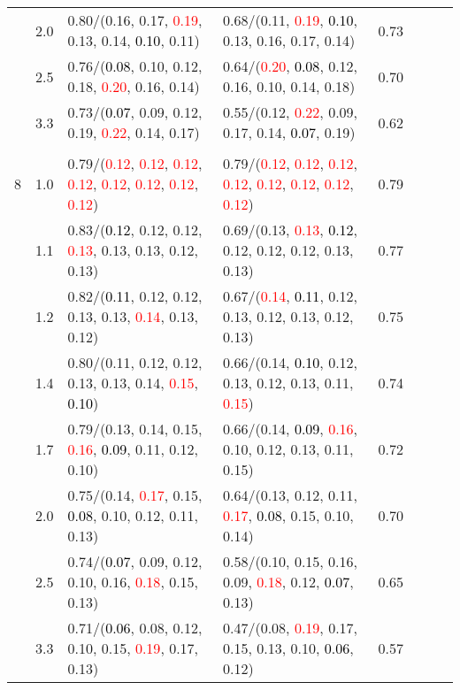 \documentclass[10pt,a4paper]{report}
\begin{document}
\begin{table}[!htbp]
\begin{center}
{\begin{tabular}{ccllcccc}
			&2.0&0.80/(0.16, 0.17, \textcolor{red}{0.19}, 0.13, 0.14, \textcolor{black}{0.10}, 0.11)&0.68/(0.11, \textcolor{red}{0.19}, \textcolor{black}{0.10}, 0.13, 0.16, 0.17, 0.14)&0.73\\
			&2.5&0.76/(\textcolor{black}{0.08}, 0.10, 0.12, 0.18, \textcolor{red}{0.20}, 0.16, 0.14)&0.64/(\textcolor{red}{0.20}, \textcolor{black}{0.08}, 0.12, 0.16, 0.10, 0.14, 0.18)&0.70\\
			&3.3&0.73/(\textcolor{black}{0.07}, 0.09, 0.12, 0.19, \textcolor{red}{0.22}, 0.14, 0.17)&0.55/(0.12, \textcolor{red}{0.22}, 0.09, 0.17, 0.14, \textcolor{black}{0.07}, 0.19)&0.62\\
			&&&&\\
			8			&1.0&0.79/(\textcolor{red}{0.12}, \textcolor{red}{0.12}, \textcolor{red}{0.12}, \textcolor{red}{0.12}, \textcolor{red}{0.12}, \textcolor{red}{0.12}, \textcolor{red}{0.12}, \textcolor{red}{0.12})&0.79/(\textcolor{red}{0.12}, \textcolor{red}{0.12}, \textcolor{red}{0.12}, \textcolor{red}{0.12}, \textcolor{red}{0.12}, \textcolor{red}{0.12}, \textcolor{red}{0.12}, \textcolor{red}{0.12})&0.79\\
			&1.1&0.83/(\textcolor{black}{0.12}, 0.12, 0.12, \textcolor{red}{0.13}, 0.13, 0.13, 0.12, 0.13)&0.69/(0.13, \textcolor{red}{0.13}, \textcolor{black}{0.12}, 0.12, 0.12, 0.12, 0.13, 0.13)&0.77\\
			&1.2&0.82/(\textcolor{black}{0.11}, 0.12, 0.12, 0.13, 0.13, \textcolor{red}{0.14}, 0.13, 0.12)&0.67/(\textcolor{red}{0.14}, \textcolor{black}{0.11}, 0.12, 0.13, 0.12, 0.13, 0.12, 0.13)&0.75\\
			&1.4&0.80/(0.11, 0.12, 0.12, 0.13, 0.13, 0.14, \textcolor{red}{0.15}, \textcolor{black}{0.10})&0.66/(0.14, \textcolor{black}{0.10}, 0.12, 0.13, 0.12, 0.13, 0.11, \textcolor{red}{0.15})&0.74\\
			&1.7&0.79/(0.13, 0.14, 0.15, \textcolor{red}{0.16}, \textcolor{black}{0.09}, 0.11, 0.12, 0.10)&0.66/(0.14, \textcolor{black}{0.09}, \textcolor{red}{0.16}, 0.10, 0.12, 0.13, 0.11, 0.15)&0.72\\
			&2.0&0.75/(0.14, \textcolor{red}{0.17}, 0.15, \textcolor{black}{0.08}, 0.10, 0.12, 0.11, 0.13)&0.64/(0.13, 0.12, 0.11, \textcolor{red}{0.17}, \textcolor{black}{0.08}, 0.15, 0.10, 0.14)&0.70\\
			&2.5&0.74/(\textcolor{black}{0.07}, 0.09, 0.12, 0.10, 0.16, \textcolor{red}{0.18}, 0.15, 0.13)&0.58/(0.10, 0.15, 0.16, 0.09, \textcolor{red}{0.18}, 0.12, \textcolor{black}{0.07}, 0.13)&0.65\\
			&3.3&0.71/(\textcolor{black}{0.06}, 0.08, 0.12, 0.10, 0.15, \textcolor{red}{0.19}, 0.17, 0.13)&0.47/(0.08, \textcolor{red}{0.19}, 0.17, 0.15, 0.13, 0.10, \textcolor{black}{0.06}, 0.12)&0.57\\
			\bottomrule
		\end{tabular}}
	\end{center}
\end{table}
\end{document}

